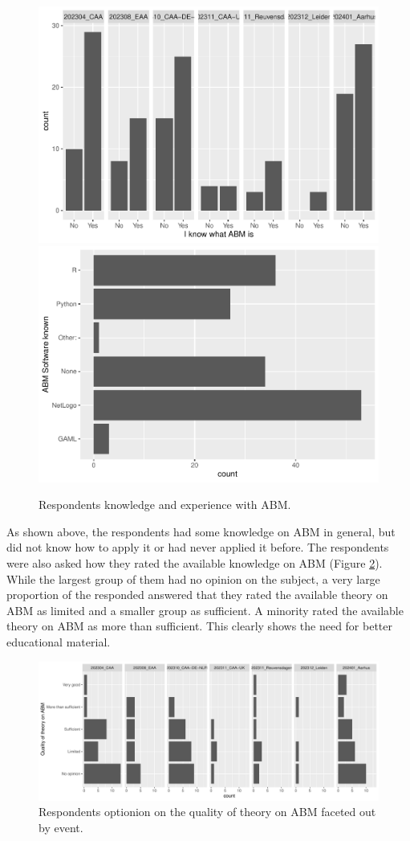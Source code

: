 \documentclass[
]{article}
\begin{document}
\begin{figure}
\includegraphics[width=0.5\linewidth]{paper_files/figure-latex/abm-knowledge-1} \includegraphics[width=0.5\linewidth]{paper_files/figure-latex/abm-knowledge-2} \caption{Respondents knowledge and experience with ABM.}\label{fig:abm-knowledge}
\end{figure}

As shown above, the respondents had some knowledge on ABM in general, but did not know how to apply it or had never applied it before. The respondents were also asked how they rated the available knowledge on ABM (Figure \ref{fig:available-theory}). While the largest group of them had no opinion on the subject, a very large proportion of the responded answered that they rated the available theory on ABM as limited and a smaller group as sufficient. A minority rated the available theory on ABM as more than sufficient. This clearly shows the need for better educational material.

\begin{figure}
\centering
\includegraphics{paper_files/figure-latex/available-theory-1.pdf}
\caption{\label{fig:available-theory}Respondents optionion on the quality of theory on ABM faceted out by event.}
\end{figure}
\end{document}
